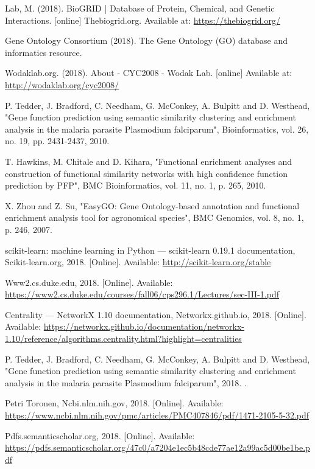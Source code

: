 \documentclass[9pt]{article}
\begin{document}
\begin{thebibliography}{8}
Lab, M. (2018). BioGRID | Database of Protein, Chemical, and Genetic Interactions. [online] Thebiogrid.org. Available at: \url{https://thebiogrid.org/}

Gene Ontology Consortium (2018). The Gene Ontology (GO) database and informatics resource.

Wodaklab.org. (2018). About - CYC2008 - Wodak Lab. [online] Available at: \url{http://wodaklab.org/cyc2008/}

P. Tedder, J. Bradford, C. Needham, G. McConkey, A. Bulpitt and D. Westhead, "Gene function prediction using semantic similarity clustering and enrichment analysis in the malaria parasite Plasmodium falciparum", Bioinformatics, vol. 26, no. 19, pp. 2431-2437, 2010.

T. Hawkins, M. Chitale and D. Kihara, "Functional enrichment analyses and construction of functional similarity networks with high confidence function prediction by PFP", BMC Bioinformatics, vol. 11, no. 1, p. 265, 2010.

X. Zhou and Z. Su, "EasyGO: Gene Ontology-based annotation and functional enrichment analysis tool for agronomical species", BMC Genomics, vol. 8, no. 1, p. 246, 2007.

scikit-learn: machine learning in Python — scikit-learn 0.19.1 documentation, Scikit-learn.org, 2018. [Online]. Available: \url{http://scikit-learn.org/stable}

Www2.cs.duke.edu, 2018. [Online]. Available: \url{https://www2.cs.duke.edu/courses/fall06/cps296.1/Lectures/sec-III-1.pdf}

Centrality — NetworkX 1.10 documentation, Networkx.github.io, 2018. [Online]. Available: \url{https://networkx.github.io/documentation/networkx-1.10/reference/algorithms.centrality.html?highlight=centralities}

P. Tedder, J. Bradford, C. Needham, G. McConkey, A. Bulpitt and D. Westhead, "Gene function prediction using semantic similarity clustering and enrichment analysis in the malaria parasite Plasmodium falciparum", 2018. .

Petri Toronen, Ncbi.nlm.nih.gov, 2018. [Online]. Available: \url{https://www.ncbi.nlm.nih.gov/pmc/articles/PMC407846/pdf/1471-2105-5-32.pdf}

Pdfs.semanticscholar.org, 2018. [Online]. Available: \url{https://pdfs.semanticscholar.org/47c0/a7204e1ec5b48cde77ae12a99ac5d00be1be.pdf}


\end{thebibliography}
\end{document}
